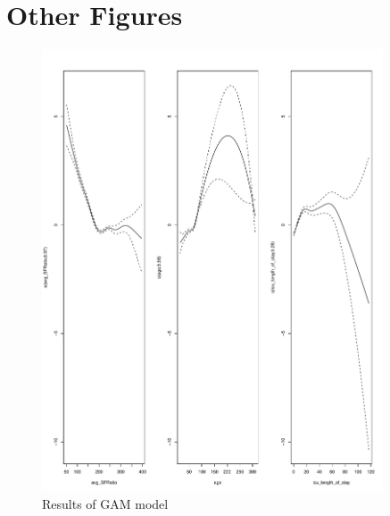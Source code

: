 
\chapter{Other Figures} %

\label{AppendixA} %

\begin{figure}[H]
  \centering
    \includegraphics[width=0.9\textwidth]{figures/GAM.pdf}
  \caption{Results of GAM model}
  \label{fig:GAM_All}
\end{figure}

